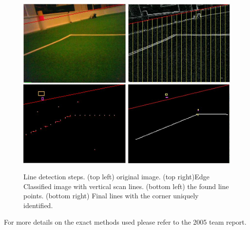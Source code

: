 \begin{figure}[htpb]
\begin{center}
    \scalebox{0.8} {\includegraphics{RobinFig/linesfig.png} }
    \caption{Line detection steps. (top left) original image. (top right)Edge Classified image with vertical scan lines. (bottom left) the found line points. (bottom right) Final lines with the corner uniquely identified.}
    \label{fig:lines1}
\end{center}
\end{figure}

For more details on the exact methods used please refer to the 2005 team report.